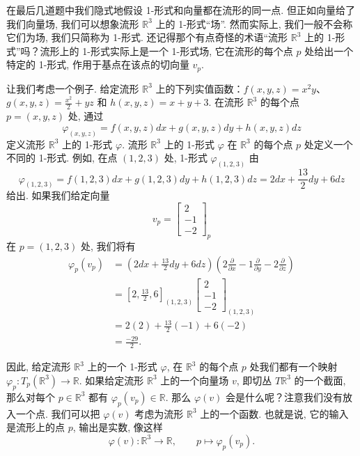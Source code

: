 在最后几道题中我们隐式地假设 1-形式和向量都在流形的同一点. 但正如向量给了我们向量场, 我们可以想象流形 $\mathbb{R}^3$ 上的 1-形式``场''. 然而实际上, 我们一般不会称它们为场, 我们只简称为 1-形式. 还记得那个有点奇怪的术语``流形 $\mathbb{R}^3$ 上的 1-形式''吗？流形上的 1-形式实际上是一个 1-形式场, 它在流形的每个点 $p$ 处给出一个特定的 1-形式, 作用于基点在该点的切向量 $v_p$.

让我们考虑一个例子. 给定流形 $\mathbb{R}^3$ 上的下列实值函数：$f(x,y,z)=x^2y$、$g(x,y,z)=\frac{x^2}{2}+yz$ 和 $h(x,y,z)=x+y+3$. 在流形 $\mathbb{R}^3$ 的每个点 $p=(x,y,z)$ 处, 通过
\[
\varphi_{(x,y,z)}=f(x,y,z)dx+g(x,y,z)dy+h(x,y,z)dz
\]
定义流形 $\mathbb{R}^3$ 上的 1-形式 $\varphi$. 流形 $\mathbb{R}^3$ 上的 1-形式 $\varphi$ 在 $\mathbb{R}^3$ 的每个点 $p$ 处定义一个不同的 1-形式. 例如, 在点 $(1,2,3)$ 处, 1-形式 $\varphi_{(1,2,3)}$ 由
\[
\varphi_{(1,2,3)}=f(1,2,3)dx+g(1,2,3)dy+h(1,2,3)dz=2dx+\frac{13}{2}dy+6dz
\]
给出. 如果我们给定向量
\[
v_p=\begin{bmatrix}2\\-1\\-2\end{bmatrix}_p
\]
在 $p=(1,2,3)$ 处, 我们将有
\begin{align*}
\varphi_p(v_p)&=\left(2dx+\frac{13}{2}dy+6dz\right)\left(2\frac{\partial}{\partial x}-1\frac{\partial}{\partial y}-2\frac{\partial}{\partial z}\right)\\
&=\left[2,\frac{13}{2},6\right]_{(1,2,3)}\begin{bmatrix}2\\-1\\-2\end{bmatrix}_{(1,2,3)}\\
&=2(2)+\frac{13}{2}(-1)+6(-2)\\
&=\frac{-29}{2}.
\end{align*}

因此, 给定流形 $\mathbb{R}^3$ 上的一个 1-形式 $\varphi$, 在 $\mathbb{R}^3$ 的每个点 $p$ 处我们都有一个映射 $\varphi_p:T_p(\mathbb{R}^3)\to\mathbb{R}$. 如果给定流形 $\mathbb{R}^3$ 上的一个向量场 $v$, 即切丛 $T\mathbb{R}^3$ 的一个截面, 那么对每个 $p\in\mathbb{R}^3$ 都有 $\varphi_p(v_p)\in\mathbb{R}$. 那么 $\varphi(v)$ 会是什么呢？注意我们没有放入一个点. 我们可以把 $\varphi(v)$ 考虑为流形 $\mathbb{R}^3$ 上的一个函数. 也就是说, 它的输入是流形上的点 $p$, 输出是实数, 像这样
\[
\varphi(v):\mathbb{R}^3\to\mathbb{R},\qquad p\longmapsto\varphi_p(v_p).
\]

